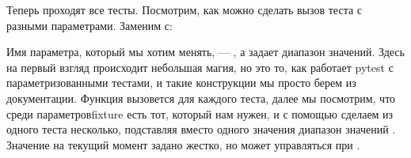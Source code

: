 \documentclass[letterpaper,10pt,russian]{sphinxmanual}
\begin{document}
\begin{sphinxVerbatim}[commandchars=\\\{\}]
  

 
     
\end{sphinxVerbatim}

\sphinxAtStartPar
Теперь проходят все тесты. Посмотрим, как можно сделать вызов теста с разными параметрами. Заменим с:

\begin{sphinxVerbatim}[commandchars=\\\{\}]
 
       
              
         
\end{sphinxVerbatim}

\sphinxAtStartPar
Имя параметра, который мы хотим менять, — , а  задает диапазон значений. Здесь на первый взгляд происходит небольшая магия, но это то, как работает pytest с параметризованными тестами, и такие конструкции мы просто берем из документации. Функция  вызовется для каждого теста, далее мы посмотрим, что среди параметров\sphinxhyphen{}fixture есть тот, который нам нужен, и с помощью   сделаем из одного теста несколько, подставляя вместо одного значения диапазон значений . Значение  на текущий момент задано жестко, но может управляться при .

\sphinxAtStartPar
{}
\end{document}
